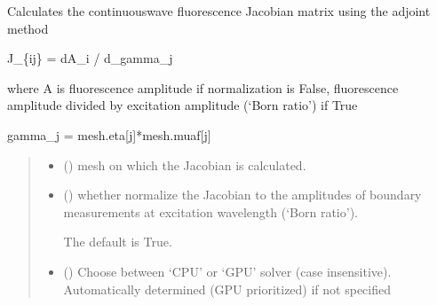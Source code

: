 \documentclass[letterpaper,10pt,english]{sphinxmanual}
\begin{document}
\begin{fulllineitems}
\label{\detokenize{_autosummary/nirfasterff.inverse.jacobian_fl_CW:nirfasterff.inverse.jacobian_fl_CW}}
\pysigstartsignatures
\pysiglinewithargsret
{}
{\sphinxparamcomma {}\sphinxparamcomma {}\sphinxparamcomma {}}
{}
\pysigstopsignatures
\sphinxAtStartPar
Calculates the continuous\sphinxhyphen{}wave fluorescence Jacobian matrix using the adjoint method

\sphinxAtStartPar
J\_\{ij\} = dA\_i / d\_gamma\_j

\sphinxAtStartPar
where A is fluorescence amplitude if normalization is False, fluorescence amplitude divided by excitation amplitude (‘Born ratio’) if True

\sphinxAtStartPar
gamma\_j = mesh.eta{[}j{]}*mesh.muaf{[}j{]}
\begin{quote}\begin{description}
\begin{itemize}
\item {} 
\sphinxAtStartPar
{} () \textendash{} mesh on which the Jacobian is calculated.

\item {} 
\sphinxAtStartPar
{} (\sphinxstyleliteralemphasis{\sphinxupquote{, }}) \textendash{} 
\sphinxAtStartPar
whether normalize the Jacobian to the amplitudes of boundary measurements at excitation wavelength (‘Born ratio’).

\sphinxAtStartPar
The default is True.


\item {} 
\sphinxAtStartPar
{} (\sphinxstyleliteralemphasis{\sphinxupquote{, }}) \textendash{} Choose between ‘CPU’ or ‘GPU’ solver (case insensitive). Automatically determined (GPU prioritized) if not specified


\end{itemize}
\end{description}
\end{quote}
\end{fulllineitems}
\end{document}
